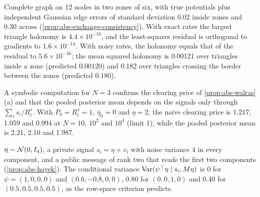 \begin{numcheck}\label{chk:abs-exchange}
Complete graph on 12 nodes in two zones of six, with true potentials plus independent Gaussian edge errors of standard deviation 0.02 inside zones and 0.30 across (\cref{prop:abs-exchange-consistency}). With exact rates the largest triangle holonomy is $4.4\times10^{-16}$, and the least-squares residual is orthogonal to gradients to $1.6\times10^{-14}$. With noisy rates, the holonomy equals that of the residual to $5.6\times10^{-16}$; the mean squared holonomy is 0.00121 over triangles inside a zone (predicted 0.00120) and 0.182 over triangles crossing the border between the zones (predicted 0.180).
\end{numcheck}

\begin{numcheck}\label{chk:abs-walras}
A symbolic computation for $N=3$ confirms the clearing price of \cref{prop:abs-walras}(a) and that the pooled posterior mean depends on the signals only through $\sum_is_i/R^s_i$. With $P_0=R^s_i=1$, $\bar\eta_0=0$ and $\eta=2$, the naive clearing price is 1.217, 1.059 and 0.994 at $N=10$, $10^2$ and $10^4$ (limit 1), while the pooled posterior mean is 2.21, 2.10 and 1.987.
\end{numcheck}

\begin{numcheck}\label{chk:abs-hayek}
$\eta\sim\mathcal{N}(0,I_4)$, a private signal $s_i=\eta+v_i$ with noise variance 4 in every component, and a public message of rank two that reads the first two components (\cref{prop:abs-hayek}). The conditional variance $\operatorname{Var}(\psi^\top\eta\mid s_i,M\eta)$ is 0 for $\psi=(1,0,0,0)$ and $(0.6,-0.8,0,0)$, 0.80 for $(0,0,1,0)$ and 0.40 for $(0.5,0.5,0.5,0.5)$, as the row-space criterion predicts.
\end{numcheck}

